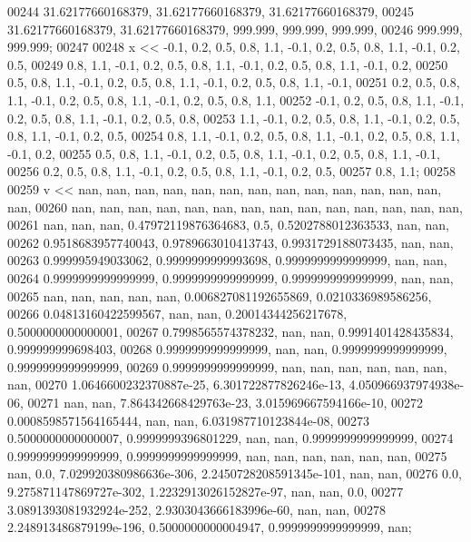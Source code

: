 \begin{DoxyCode}
00244         31.62177660168379, 31.62177660168379, 31.62177660168379,
00245         31.62177660168379, 31.62177660168379, 999.999, 999.999, 999.999,
00246         999.999, 999.999;
00247 
00248     x << -0.1, 0.2, 0.5, 0.8, 1.1, -0.1, 0.2, 0.5, 0.8, 1.1, -0.1, 0.2, 0.5,
00249         0.8, 1.1, -0.1, 0.2, 0.5, 0.8, 1.1, -0.1, 0.2, 0.5, 0.8, 1.1, -0.1, 0.2,
00250         0.5, 0.8, 1.1, -0.1, 0.2, 0.5, 0.8, 1.1, -0.1, 0.2, 0.5, 0.8, 1.1, -0.1,
00251         0.2, 0.5, 0.8, 1.1, -0.1, 0.2, 0.5, 0.8, 1.1, -0.1, 0.2, 0.5, 0.8, 1.1,
00252         -0.1, 0.2, 0.5, 0.8, 1.1, -0.1, 0.2, 0.5, 0.8, 1.1, -0.1, 0.2, 0.5, 0.8,
00253         1.1, -0.1, 0.2, 0.5, 0.8, 1.1, -0.1, 0.2, 0.5, 0.8, 1.1, -0.1, 0.2, 0.5,
00254         0.8, 1.1, -0.1, 0.2, 0.5, 0.8, 1.1, -0.1, 0.2, 0.5, 0.8, 1.1, -0.1, 0.2,
00255         0.5, 0.8, 1.1, -0.1, 0.2, 0.5, 0.8, 1.1, -0.1, 0.2, 0.5, 0.8, 1.1, -0.1,
00256         0.2, 0.5, 0.8, 1.1, -0.1, 0.2, 0.5, 0.8, 1.1, -0.1, 0.2, 0.5,
00257         0.8, 1.1;
00258 
00259     v << nan, nan, nan, nan, nan, nan, nan, nan, nan, nan, nan, nan, nan, nan,
00260         nan, nan, nan, nan, nan, nan, nan, nan, nan, nan, nan, nan, nan, nan,
00261         nan, nan, nan, 0.47972119876364683, 0.5, 0.5202788012363533, nan, nan,
00262         0.9518683957740043, 0.9789663010413743, 0.9931729188073435, nan, nan,
00263         0.999995949033062, 0.9999999999993698, 0.9999999999999999, nan, nan,
00264         0.9999999999999999, 0.9999999999999999, 0.9999999999999999, nan, nan,
00265         nan, nan, nan, nan, nan, 0.006827081192655869, 0.0210336989586256,
00266         0.04813160422599567, nan, nan, 0.20014344256217678, 0.5000000000000001,
00267         0.7998565574378232, nan, nan, 0.9991401428435834, 0.999999999698403,
00268         0.9999999999999999, nan, nan, 0.9999999999999999, 0.9999999999999999,
00269         0.9999999999999999, nan, nan, nan, nan, nan, nan, nan,
00270         1.0646600232370887e-25, 6.301722877826246e-13, 4.050966937974938e-06,
00271         nan, nan, 7.864342668429763e-23, 3.015969667594166e-10,
00272         0.0008598571564165444, nan, nan, 6.031987710123844e-08,
00273         0.5000000000000007, 0.9999999396801229, nan, nan, 0.9999999999999999,
00274         0.9999999999999999, 0.9999999999999999, nan, nan, nan, nan, nan, nan,
00275         nan, 0.0, 7.029920380986636e-306, 2.2450728208591345e-101, nan, nan,
00276         0.0, 9.275871147869727e-302, 1.2232913026152827e-97, nan, nan, 0.0,
00277         3.0891393081932924e-252, 2.9303043666183996e-60, nan, nan,
00278         2.248913486879199e-196, 0.5000000000004947, 0.9999999999999999, nan;

\end{DoxyCode}
